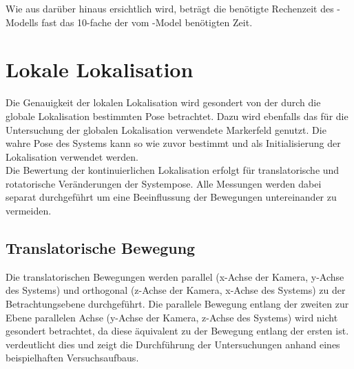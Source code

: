
Wie aus  darüber hinaus ersichtlich wird, beträgt die benötigte Rechenzeit des \red[Raycasting]-Modells fast das \SI{10}{}-fache der vom \red[Endpoint]-Model benötigten Zeit. 






\section{Lokale Lokalisation}%
Die Genauigkeit der lokalen Lokalisation wird gesondert von der durch die globale Lokalisation bestimmten Pose betrachtet. Dazu wird ebenfalls das für die Untersuchung der globalen Lokalisation verwendete Markerfeld genutzt. Die wahre Pose des Systems kann so wie zuvor bestimmt und als Initialisierung der Lokalisation verwendet werden.\\

Die Bewertung der kontinuierlichen Lokalisation erfolgt für translatorische und rotatorische Veränderungen der Systempose. Alle Messungen werden dabei separat durchgeführt um eine Beeinflussung der Bewegungen untereinander zu vermeiden.\\

\subsection{Translatorische Bewegung}
Die translatorischen Bewegungen werden parallel (x-Achse der Kamera, y-Achse des Systems) und orthogonal (z-Achse der Kamera, x-Achse des Systems) zu der Betrachtungsebene durchgeführt. Die parallele Bewegung entlang der zweiten zur Ebene parallelen Achse (y-Achse der Kamera, z-Achse des Systems) wird nicht gesondert betrachtet, da diese äquivalent zu der Bewegung entlang der ersten ist.  verdeutlicht dies und zeigt die Durchführung der Untersuchungen anhand eines beispielhaften Versuchsaufbaus.\\

